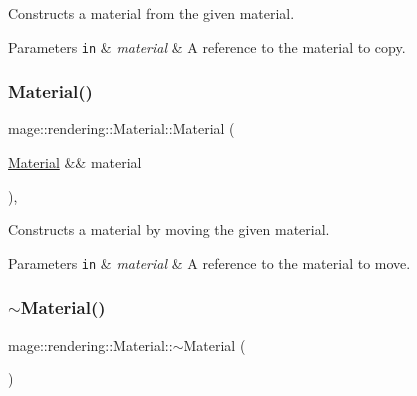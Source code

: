 Constructs a material from the given material.


\begin{DoxyParams}[1]{Parameters}
\mbox{\tt in}  & {\em material} & A reference to the material to copy. \\
\hline
\end{DoxyParams}
\mbox{\label{classmage_1_1rendering_1_1_material_a52f4b3b0849b96306ea79c746070c6ba}} 
\subsubsection{\texorpdfstring{Material()}{Material()}\hspace{0.1cm}{\footnotesize\ttfamily [3/3]}}
{\footnotesize\ttfamily mage\+::rendering\+::\+Material\+::\+Material (\begin{DoxyParamCaption}\item[{\mbox{\hyperlink{classmage_1_1rendering_1_1_material}{Material}} \&\&}]{material }\end{DoxyParamCaption})\hspace{0.3cm}{\ttfamily [default]}, {\ttfamily [noexcept]}}

Constructs a material by moving the given material.


\begin{DoxyParams}[1]{Parameters}
\mbox{\tt in}  & {\em material} & A reference to the material to move. \\
\hline
\end{DoxyParams}
\mbox{\label{classmage_1_1rendering_1_1_material_a0dcdba799e013b2a8ff0108b14b9a73c}} 
\subsubsection{\texorpdfstring{$\sim$\+Material()}{~Material()}}
{\footnotesize\ttfamily mage\+::rendering\+::\+Material\+::$\sim$\+Material (\begin{DoxyParamCaption}{ }\end{DoxyParamCaption})\hspace{0.3cm}{\ttfamily [default]}}

